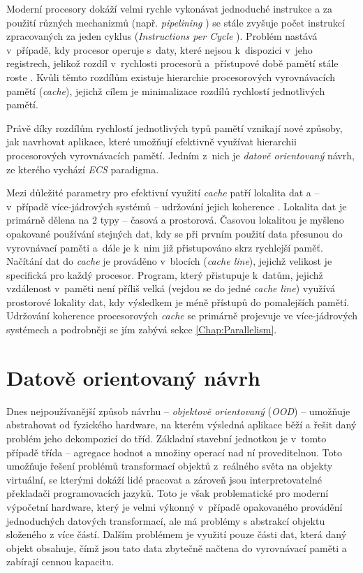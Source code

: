 Moderní procesory dokáží velmi rychle vykonávat jednoduché instrukce a za použití různých mechanizmů (např. \emph{pipelining} \cite{Pipelining}) se stále zvyšuje počet instrukcí zpracovaných za jeden cyklus (\emph{Instructions per Cycle} \cite{CpuIpc}). Problém nastává v~případě, kdy procesor operuje s~daty, které nejsou k~dispozici v~jeho registrech, jelikož rozdíl v~rychlosti procesorů a~přístupové době pamětí stále roste \cite{CpuMemoryGap}. Kvůli těmto rozdílům existuje hierarchie procesorových vyrovnávacích pamětí (\emph{cache}), jejichž cílem je minimalizace rozdílů rychlostí jednotlivých pamětí.

Právě díky rozdílům rychlostí jednotlivých typů pamětí \cite{MemoryTiming} vznikají nové způsoby, jak navrhovat aplikace, které umožňují efektivně využívat hierarchii procesorových vyrovnávacích pamětí. Jedním z~nich je \emph{datově orientovaný} návrh, ze kterého vychází \emph{ECS} paradigma.

Mezi důležité parametry pro efektivní využití \emph{cache} patří lokalita dat \cite{DataLocality} a -- v~případě více-jádrových systémů -- udržování jejich koherence \cite{CacheCoherence}. Lokalita dat je primárně dělena na 2 typy -- časová a prostorová. Časovou lokalitou je myšleno opakované používání stejných dat, kdy se při prvním použití data přesunou do vyrovnávací paměti a~dále je k~nim již přistupováno skrz rychlejší paměť. Načítání dat do \emph{cache} je prováděno v~blocích (\emph{cache line}), jejichž velikost je specifická pro každý procesor. Program, který přistupuje k~datům, jejichž vzdálenost v~paměti není příliš velká (vejdou se do jedné \emph{cache line}) využívá prostorové lokality dat, kdy výsledkem je méně přístupů do pomalejších pamětí. Udržování koherence procesorových \emph{cache} se primárně projevuje ve více-jádrových systémech a podrobněji se jím zabývá sekce \ref{Chap:Parallelism}.

\section{Datově orientovaný návrh}
\label{Chap:DDD}

Dnes nejpoužívanější způsob návrhu -- \emph{objektově orientovaný} (\emph{OOD}) -- umožňuje abstrahovat od fyzického hardware, na kterém výsledná aplikace běží a řešit daný problém jeho dekompozicí do tříd. Základní stavební jednotkou je v~tomto případě třída -- agregace hodnot a  množiny operací nad ní proveditelnou. Toto umožňuje řešení problémů transformací objektů z~reálného světa na objekty virtuální, se kterými dokáží lidé pracovat a zároveň jsou interpretovatelné překladači programovacích jazyků. Toto je však problematické pro moderní výpočetní hardware, který je velmi výkonný v~případě opakovaného provádění jednoduchých datových transformací, ale má problémy s abstrakcí objektu složeného z více částí. Dalším problémem je využití pouze části dat, která daný objekt obsahuje, čímž jsou tato data zbytečně načtena do vyrovnávací paměti a zabírají cennou kapacitu.

